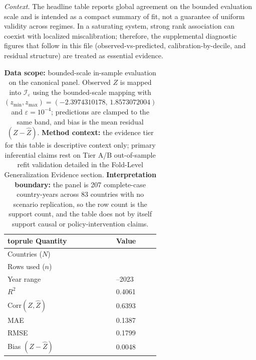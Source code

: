 \documentclass[11pt]{article}
\newcommand{\TableStyle}{%
    \small
    \setlength{\tabcolsep}{2pt}%
    \renewcommand{\arraystretch}{0.9}%
}
\begin{document}
\noindent\justifying
\textit{Context.} The headline table reports global agreement on the bounded evaluation scale and is intended as a
compact summary of fit, not a guarantee of uniform validity across regimes. In a saturating system, strong rank
association can coexist with localized miscalibration; therefore, the supplemental diagnostic figures that follow in
this file (observed-vs-predicted, calibration-by-decile, and residual structure) are treated as essential evidence.
\begin{table}[!htbp]
\centering
\TableStyle
\captionsetup{justification=RaggedRight,singlelinecheck=false}
\caption{\textbf{Data scope:} bounded-scale in-sample evaluation on the canonical panel. Observed $Z$ is mapped into $\mathcal{I}_\varepsilon$ using the bounded-scale mapping with $(z_{\min},z_{\max})=(\num{-2.3974310178},\,\num{1.8573072004})$ and $\varepsilon=10^{-4}$; predictions are clamped to the same band, and bias is the mean residual $(Z-\widehat{Z})$. \textbf{Method context:} the evidence tier for this table is descriptive context only; primary inferential claims rest on Tier A/B out-of-sample refit validation detailed in the Fold-Level Generalization Evidence section. \textbf{Interpretation boundary:} the panel is 207 complete-case country-years across 83 countries with no scenario replication, so the row count is the support count, and the table does not by itself support causal or policy-intervention claims.}
\label{supp-tab:panel_fit_headline}
\begin{tabularx}{0.86\linewidth}{@{}l >{\raggedleft\arraybackslash}X@{}}

\csname toprule\endcsname
Quantity & Value \\
\midrule
Countries ($N$) & 83 \\
Rows used ($n$) & 207 \\
Year range & 1990--2023 \\
$R^2$ & \num{0.4061} \\
$\mathrm{Corr}(Z,\widehat{Z})$ & \num{0.6393} \\
MAE & \num{0.1387} \\
RMSE & \num{0.1799} \\
Bias $(Z-\widehat{Z})$ & \num{0.0048} \\
\bottomrule
\end{tabularx}
\end{table}
\end{document}
